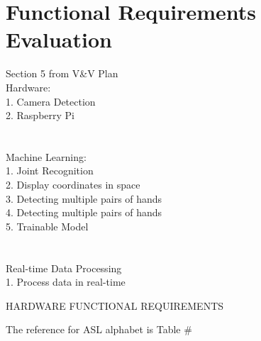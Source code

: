 \documentclass[12pt, titlepage]{article}
\begin{document}
\section{Functional Requirements Evaluation}
Section 5 from V&V Plan \\
Hardware: \\
1. Camera Detection \\
2. Raspberry Pi \\
\\~\\
Machine Learning: \\
1. Joint Recognition \\
2. Display coordinates in space \\
3. Detecting multiple pairs of hands \\
4. Detecting multiple pairs of hands \\
5. Trainable Model  \\
\\~\\
Real-time Data Processing \\ 
1. Process data in real-time \\

\newpage
\centerline{HARDWARE FUNCTIONAL REQUIREMENTS}
\centerline{The reference for ASL alphabet is Table \#}
\end{document}
